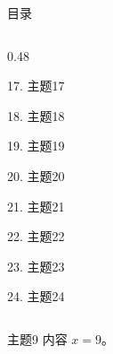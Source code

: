 \documentclass[aspectratio=169,10pt,fontset=fandol]{ctexbeamer}
\begin{document}
\begin{frame}[t,fragile]{目录}
\begin{columns}[T,onlytextwidth]
\begin{column}{0.48\textwidth}
{\color{gray!40}\small 17. 主题17\par}\vspace{0.22em}
{\color{gray!40}\small 18. 主题18\par}\vspace{0.22em}
{\color{gray!40}\small 19. 主题19\par}\vspace{0.22em}
{\color{gray!40}\small 20. 主题20\par}\vspace{0.22em}
{\color{gray!40}\small 21. 主题21\par}\vspace{0.22em}
{\color{gray!40}\small 22. 主题22\par}\vspace{0.22em}
{\color{gray!40}\small 23. 主题23\par}\vspace{0.22em}
{\color{gray!40}\small 24. 主题24\par}\vspace{0.22em}
\end{column}
\end{columns}
\end{frame}
\begin{frame}[t,fragile]{主题9}
\normalsize
{\normalsize
内容 $x=9$。
}
\end{frame}
\end{document}
